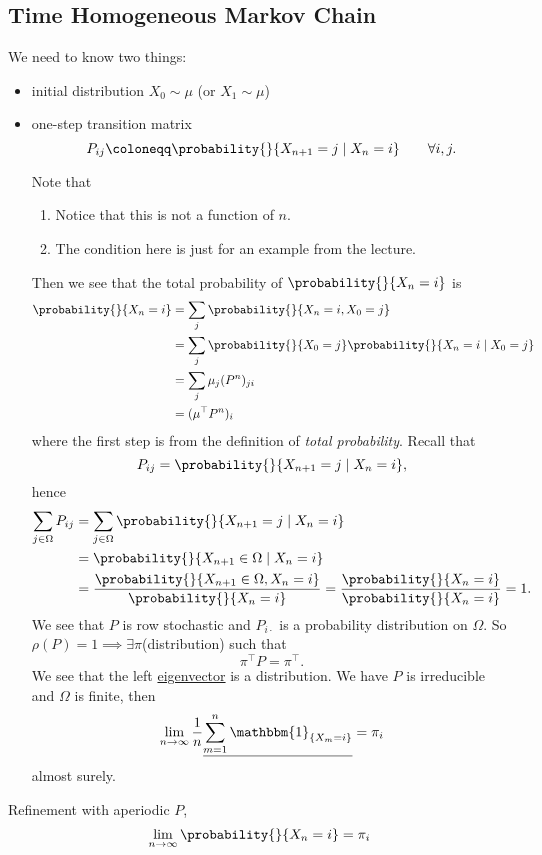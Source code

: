 \subsection{Time Homogeneous Markov Chain}
We need to know two things:
\begin{itemize}
	\item initial distribution \(X_0 \sim \mu\) (or \(X_1\sim \mu\))
	\item one-step transition matrix
	      \[
		      P_{ij} \coloneqq \probability{}{X_{n+1} = j \mid X_n = i}\qquad \forall i, j.
	      \]


	      \begin{note}
		      Note that
		      \begin{enumerate}
			      \item Notice that this is not a function of \(n\).
			      \item The condition here is just for an example from the lecture.
		      \end{enumerate}
	      \end{note}

	      Then we see that the total probability of \(\probability{}{X_n = i}\) is
	      \[
		      \begin{split}
			      \probability{}{X_n = i} &= \sum_j \probability{}{X_n = i, X_0 = j}\\
			      &= \sum_j \probability{}{X_0 = j}\probability{}{X_n = i  \mid  X_0 = j}\\
			      &=\sum_j \mu_{j} (P^n)_{ji}\\
			      &= (\mu^{\top} P^n)_i
		      \end{split}
	      \]
	      where the first step is from the definition of \emph{total probability}. Recall that
	      \[
		      P_{ij} = \probability{}{X_{n+1} = j \mid X_n = i},
	      \]
	      hence
	      \[
		      \begin{split}
			      \sum_{j\in \Omega} P_{ij} &= \sum_{j\in \Omega} \probability{}{X_{n+1} = j \mid X_n = i}\\
			      &= \probability{}{X_{n+1}\in \Omega \mid X_n = i}\\
			      &= \frac{\probability{}{X_{n+1}\in \Omega, X_n = i} }{\probability{}{X_n = i} }
			      = \frac{\probability{}{X_n = i} }{\probability{}{X_n = i} }
			      = 1.
		      \end{split}
	      \]
	      We see that \(P\) is row stochastic and \(P_{i\cdot}\) is a probability distribution on \(\Omega\). So \(\rho(P) = 1\implies \exists  \pi\)(distribution) such that
	      \[
		      \pi^{\top} P = \pi^{\top}.
	      \]
	      We see that the left \hyperref[def:eigenvector]{eigenvector} is a distribution. We have \(P\) is irreducible and \(\Omega\) is finite, then
	      \[
		      \lim_{n\to \infty } \frac{1}{n}\underline{\sum\limits_{m=1}^{n}  \mathbbm{1}_{\left\{ X_m = i \right\} }} = \pi_i
	      \]
	      almost surely.
\end{itemize}

Refinement with aperiodic \(P\),
\[
	\lim_{n\to \infty }\probability{}{X_n = i} = \pi_i
\]